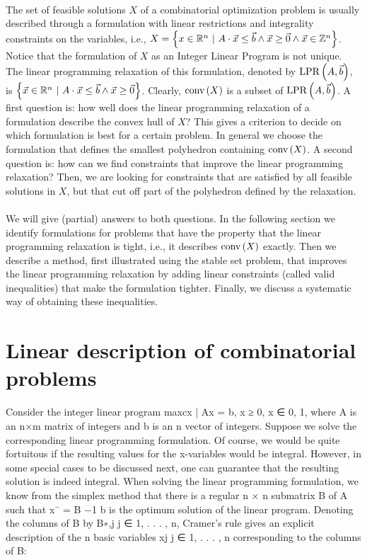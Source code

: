 \documentclass[titlepage]{book}
\theoremstyle{definition}
\begin{document}
\paragraph{}
The set of feasible solutions $X$ of a combinatorial optimization problem is usually described through a formulation with linear restrictions and integrality constraints on the variables, i.e., $X=\left\{ x\in\mathbb{R}^n\ |\ A\cdot\vec{x}\leq\vec{b}\wedge\vec{x}\geq\vec{0}\wedge\vec{x}\in\mathbb{Z}^n \right\}$. Notice that the formulation of $X$ as an Integer Linear Program is not unique. The linear programming relaxation of this formulation, denoted by $\mbox{LPR}\left( A,\vec{b} \right)$, is $\left\{ \vec{x}\in\mathbb{R}^n\ |\ A\cdot\vec{x}\leq\vec{b}\wedge\vec{x}\geq\vec{0} \right\}$. Clearly, $\mbox{conv}\left( X \right)$ is a subset of $\mbox{LPR}\left( A,\vec{b} \right)$. A first question is: how well does the linear programming relaxation of a formulation describe the convex hull of $X$? This gives a criterion to decide on which formulation is best for a certain problem. In general we choose the formulation that defines the smallest polyhedron containing $\mbox{conv}\left( X \right)$. A second question is: how can we find constraints that improve the linear programming relaxation? Then, we are looking for constraints that are satisfied by all feasible solutions in $X$, but that cut off part of the polyhedron defined by the relaxation.

\paragraph{}
We will give (partial) answers to both questions. In the following section we identify formulations for problems that have the property that the linear programming relaxation is tight, i.e., it describes $\mbox{conv}\left( X \right)$ exactly. Then we describe a method, first illustrated using the stable set problem, that improves the linear programming relaxation by adding linear constraints (called valid inequalities) that make the formulation tighter. Finally, we discuss a systematic way of obtaining these inequalities.

\section{Linear description of combinatorial problems}

Consider the integer linear program
max{cx | Ax = b, x ≥ 0, x ∈ {0, 1}},
where A is an n×m matrix of integers and b is an n vector of integers. Suppose we solve the corresponding
linear programming formulation. Of course, we would be quite fortuitous if the resulting values for the
x-variables would be integral. However, in some special cases to be discussed next, one can guarantee
that the resulting solution is indeed integral.
When solving the linear programming formulation, we know from the simplex method that there is a
regular n × n submatrix B of A such that x¯ = B −1 b is the optimum solution of the linear program.
Denoting the columns of B by B∗,j j ∈ {1, . . . , n}, Cramer's rule gives an explicit description of the n
basic variables xj j ∈ {1, . . . , n} corresponding to the columns of B:
\end{document}
